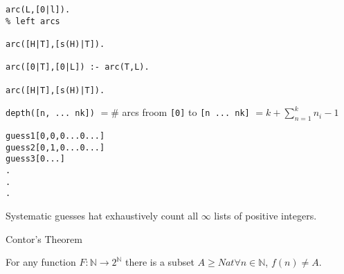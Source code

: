\documentclass[a4paper,12pt]{article}
\begin{document}


\begin{verbatim}
arc(L,[0|l]).
% left arcs

arc([H|T],[s(H)|T]).

arc([0|T],[0|L]) :- arc(T,L).

arc([H|T],[s(H)|T]).
\end{verbatim}


\verb!depth([n, ... nk])! $= \#$ arcs froom \verb![0]! to \verb![n ... nk]! 
$= k + \sum^{k}_{n = 1} n_{i} - 1$


\begin{verbatim}
guess1[0,0,0...0...]
guess2[0,1,0...0...]
guess3[0...]
.
.
.
\end{verbatim}

Systematic guesses hat exhaustively count all $\infty$ lists of positive
integers.

Contor's Theorem

For any function $F: \mathbb{N} \to 2^{\mathbb{N}}$ there is a subset $A \geq Nat
\forall n \in \mathbb{N}$, $f(n) \neq A$.
\end{document}
